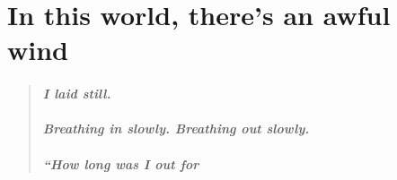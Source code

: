 \documentclass{book}
\begin{document}
\chapter{In this world, there's an awful wind}
\begin{quote}
\paragraph{I laid still.\\\\
Breathing in slowly. Breathing out slowly.\\\\
``How long was I out for}
\end{quote}
\end{document}
